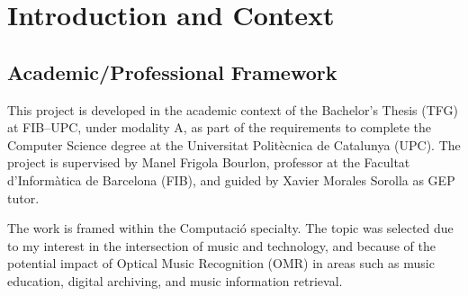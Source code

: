 \documentclass[11pt, a4paper]{article}
\begin{document}
\tableofcontents
\newpage


\section{Introduction and Context}
\subsection{Academic/Professional Framework}
This project is developed in the academic context of the Bachelor's Thesis (TFG) at FIB--UPC, under modality A, as part of the requirements to complete the Computer Science degree at the Universitat Polit\`ecnica de Catalunya (UPC). The project is supervised by Manel Frigola Bourlon, professor at the Facultat d'Inform\`atica de Barcelona (FIB), and guided by Xavier Morales Sorolla as GEP tutor.

The work is framed within the Computaci\'o specialty. The topic was selected due to my interest in the intersection of music and technology, and because of the potential impact of Optical Music Recognition (OMR) in areas such as music education, digital archiving, and music information retrieval.
\end{document}
